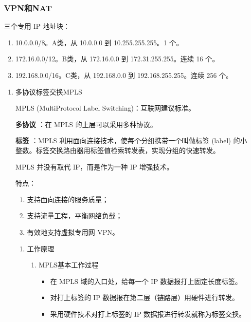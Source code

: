 \documentclass[11pt]{article}
\begin{document}
\subsubsection{VPN和NAT}
\label{sec:orgdc45ae5}

三个专用 IP 地址块：
\begin{enumerate}
\item 10.0.0.0/8。A类，从 10.0.0.0 到 10.255.255.255。1 个。
\item 172.16.0.0/12。B类，从 172.16.0.0 到 172.31.255.255。连续 16 个。
\item 192.168.0.0/16。C类，从 192.168.0.0 到 192.168.255.255。连续 256 个。
\end{enumerate}

\begin{enumerate}
\item 多协议标签交换MPLS
\label{sec:org0fa3a85}

MPLS (MultiProtocol Label Switching)：互联网建议标准。

\textbf{多协议} ：在 MPLS 的上层可以采用多种协议。

\textbf{标签} ：MPLS 利用面向连接技术，使每个分组携带一个叫做标签 (label) 的小整数。标签交换路由器用标签值检索转发表，实现分组的快速转发。

MPLS 并没有取代 IP，而是作为一种 IP 增强技术。

特点：
\begin{enumerate}
\item 支持面向连接的服务质量；
\item 支持流量工程，平衡网络负载；
\item 有效地支持虚拟专用网 VPN。
\end{enumerate}

\begin{enumerate}
\item 工作原理
\label{sec:org044b690}

\begin{enumerate}
\item MPLS基本工作过程

\begin{itemize}
\item 在 MPLS 域的入口处，给每一个 IP 数据报打上固定长度标签。

\item 对打上标签的 IP 数据报在第二层（链路层）用硬件进行转发。

\item 采用硬件技术对打上标签的 IP 数据报进行转发就称为标签交换。


\end{itemize}
\end{enumerate}
\end{enumerate}
\end{enumerate}
\end{document}
